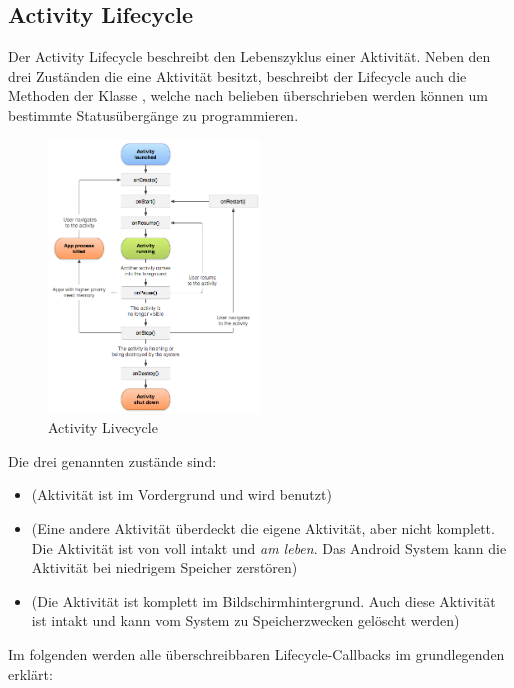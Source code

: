 \subsection{Activity Lifecycle}
Der Activity Lifecycle beschreibt den Lebenszyklus einer Aktivität. Neben den drei Zuständen die eine Aktivität besitzt, beschreibt der Lifecycle auch die Methoden der Klasse , welche nach belieben überschrieben werden können um bestimmte Statusübergänge zu programmieren.
\begin{figure}[h]
	\centering
	\includegraphics[width=0.5\textwidth]{resources/android/lifecycle}
	\caption{Activity Livecycle}
\end{figure}
Die drei genannten zustände sind:
\begin{itemize}
	\item {} (Aktivität ist im Vordergrund und wird benutzt)
	\item {} (Eine andere Aktivität überdeckt die eigene Aktivität, aber 
nicht komplett. Die Aktivität ist von voll intakt und \emph{am leben}. Das 
Android System kann die Aktivität bei niedrigem Speicher zerstören)
	\item {} (Die Aktivität ist komplett im Bildschirmhintergrund. Auch 
diese Aktivität ist intakt und kann vom System zu Speicherzwecken gelöscht 
werden)
	
\end{itemize}
Im folgenden werden alle überschreibbaren Lifecycle-Callbacks im grundlegenden erklärt:
